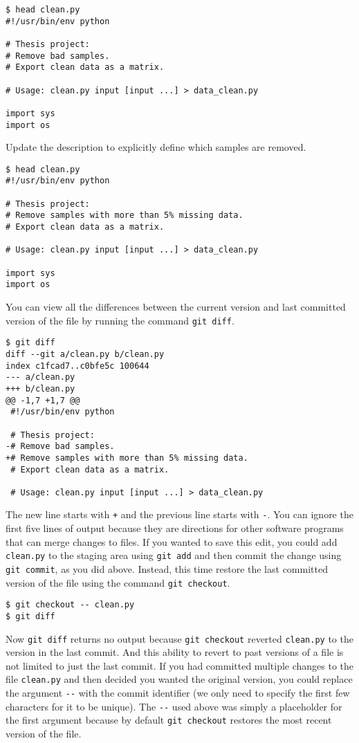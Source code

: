 \begin{lstlisting}
$ head clean.py
#!/usr/bin/env python

# Thesis project:
# Remove bad samples.
# Export clean data as a matrix.

# Usage: clean.py input [input ...] > data_clean.py

import sys
import os
\end{lstlisting}

Update the description to explicitly define which samples are removed.

\begin{lstlisting}
$ head clean.py
#!/usr/bin/env python

# Thesis project:
# Remove samples with more than 5% missing data.
# Export clean data as a matrix.

# Usage: clean.py input [input ...] > data_clean.py

import sys
import os
\end{lstlisting}

You can view all the differences between the current version and last committed version of the file by running the command \verb|git diff|.

\begin{lstlisting}
$ git diff
diff --git a/clean.py b/clean.py
index c1fcad7..c0bfe5c 100644
--- a/clean.py
+++ b/clean.py
@@ -1,7 +1,7 @@
 #!/usr/bin/env python
 
 # Thesis project:
-# Remove bad samples.
+# Remove samples with more than 5% missing data.
 # Export clean data as a matrix.
 
 # Usage: clean.py input [input ...] > data_clean.py
\end{lstlisting}

The new line starts with \verb|+| and the previous line starts with \verb|-|.
You can ignore the first five lines of output because they are directions for other software programs that can merge changes to files.
If you wanted to save this edit, you could add \verb|clean.py| to the staging area using \verb|git add| and then commit the change using \verb|git commit|, as you did above.
Instead, this time restore the last committed version of the file using the command \verb|git checkout|.

\begin{lstlisting}
$ git checkout -- clean.py
$ git diff
\end{lstlisting}

Now \verb|git diff| returns no output because \verb|git checkout| reverted \verb|clean.py| to the version in the last commit.
And this ability to revert to past versions of a file is not limited to just the last commit.
If you had committed multiple changes to the file \verb|clean.py| and then decided you wanted the original version, you could replace the argument \verb|--| with the commit identifier (we only need to specify the first few characters for it to be unique).
The \verb|--| used above was simply a placeholder for the first argument because by default \verb|git checkout| restores the most recent version of the file.

